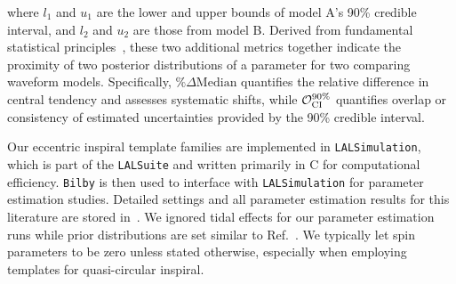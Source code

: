 \documentclass[aps,prd,twocolumn,superscriptaddress,groupedaddress,nofootinbib,showpacs,eqsecnum,useAms]{revtex4-2}
\begin{document}
where $l_1$ and $u_1$ are the lower and upper bounds of model A’s 90\% credible interval, and $l_2$ and $u_2$ are those from model B. 
Derived from fundamental statistical principles~\cite{Gelman2003, Sivia2006}, these two additional metrics together indicate the proximity of two posterior distributions of a parameter for two comparing waveform models. Specifically, $\% \Delta \mathrm{Median}$ quantifies the relative difference in central tendency and assesses systematic shifts, while ${\cal O}_{\rm CI}^{90\%}$ quantifies overlap or consistency of estimated uncertainties provided by the 90\% credible interval.

Our eccentric inspiral template families are implemented in \texttt{LALSimulation}, which is part of the \texttt{LALSuite} and written primarily in C for computational efficiency.  \texttt{Bilby} is then used to interface with \texttt{LALSimulation} for parameter estimation studies. Detailed settings and all parameter estimation results for this literature are stored in~\cite{TaylorF2EcckRepo}.
We ignored tidal effects for our parameter estimation runs while  prior distributions are set similar to Ref.~\cite{LNB}. 
We typically let spin parameters to be zero unless stated otherwise, especially when employing templates for quasi-circular inspiral.
\end{document}
